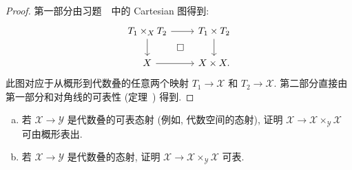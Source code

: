 \begin{proof}
第一部分由习题~~中的 Cartesian 图得到:
\[
\begin{tikzcd}
T_1\times_{\mathcal X}T_2\arrow[r]\arrow[d]\arrow[dr,phantom,"\square"]&T_1\times T_2\arrow[d]\\
\mathcal X\arrow[r]&\mathcal X\times\mathcal X.
\end{tikzcd}
\]
此图对应于从概形到代数叠的任意两个映射 $T_1\to\mathcal X$ 和 $T_2\to\mathcal X$. 第二部分直接由第一部分和对角线的可表性 (定理~) 得到.
\end{proof}
\begin{exercise}\label{src:4.2.4}
\begin{enumerate}[(a)]
\item 若 $\mathcal X\to\mathcal Y$ 是代数叠的可表态射 (例如, 代数空间的态射), 证明 $\mathcal X\to\mathcal X\times_{\mathcal Y}\mathcal X$ 可由概形表出.
\item 若 $\mathcal X\to\mathcal Y$ 是代数叠的态射, 证明 $\mathcal X\to\mathcal X\times_{\mathcal Y}\mathcal X$ 可表.
\end{enumerate}
\end{exercise}
